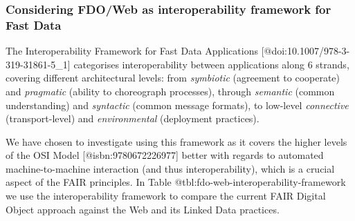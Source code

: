 \hypertarget{sec:interoperability-compare}{%
\subsubsection{Considering FDO/Web as interoperability framework for
Fast Data}\label{sec:interoperability-compare}}

The Interoperability Framework for Fast Data Applications
{[}@doi:10.1007/978-3-319-31861-5\_1{]} categorises interoperability
between applications along 6 strands, covering different architectural
levels: from \emph{symbiotic} (agreement to cooperate) and
\emph{pragmatic} (ability to choreograph processes), through
\emph{semantic} (common understanding) and \emph{syntactic} (common
message formats), to low-level \emph{connective} (transport-level) and
\emph{environmental} (deployment practices).

We have chosen to investigate using this framework as it covers the
higher levels of the OSI Model {[}@isbn:9780672226977{]} better with
regards to automated machine-to-machine interaction (and thus
interoperability), which is a crucial aspect of the FAIR principles. In
Table @tbl:fdo-web-interoperability-framework we use the
interoperability framework to compare the current FAIR Digital Object
approach against the Web and its Linked Data practices.

